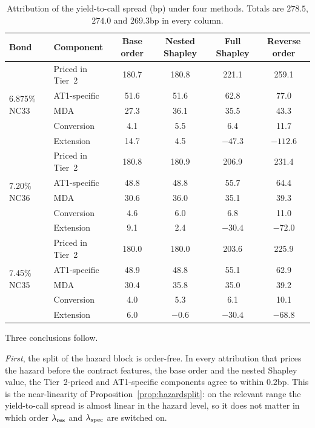 \begin{table}[H]
\centering\small
\begin{tabular}{llcccc}
\toprule
Bond & Component & Base order & Nested Shapley & Full Shapley & Reverse order \\
\midrule
\multirow{5}{*}{6.875\% NC33} & Priced in Tier~2 & 180.7 & 180.8 & 221.1 & 259.1 \\
 & AT1-specific & 51.6 & 51.6 & 62.8 & 77.0 \\
 & MDA & 27.3 & 36.1 & 35.5 & 43.3 \\
 & Conversion & 4.1 & 5.5 & 6.4 & 11.7 \\
 & Extension & 14.7 & 4.5 & $-47.3$ & $-112.6$ \\
\midrule
\multirow{5}{*}{7.20\% NC36} & Priced in Tier~2 & 180.8 & 180.9 & 206.9 & 231.4 \\
 & AT1-specific & 48.8 & 48.8 & 55.7 & 64.4 \\
 & MDA & 30.6 & 36.0 & 35.1 & 39.3 \\
 & Conversion & 4.6 & 6.0 & 6.8 & 11.0 \\
 & Extension & 9.1 & 2.4 & $-30.4$ & $-72.0$ \\
\midrule
\multirow{5}{*}{7.45\% NC35} & Priced in Tier~2 & 180.0 & 180.0 & 203.6 & 225.9 \\
 & AT1-specific & 48.9 & 48.8 & 55.1 & 62.9 \\
 & MDA & 30.4 & 35.8 & 35.0 & 39.2 \\
 & Conversion & 4.0 & 5.3 & 6.1 & 10.1 \\
 & Extension & 6.0 & $-0.6$ & $-30.4$ & $-68.8$ \\
\bottomrule
\end{tabular}
\caption{Attribution of the yield-to-call spread (bp) under four methods. Totals are
$278.5$, $274.0$ and $269.3$bp in every column.}
\label{tab:order}
\end{table}

Three conclusions follow.

\emph{First}, the split of the hazard block is order-free. In every attribution that prices
the hazard before the contract features, the base order and the nested Shapley value, the
Tier~2-priced and AT1-specific components agree to within $0.2$bp. This is the near-linearity
of Proposition~\ref{prop:hazardsplit}: on the relevant range the yield-to-call spread is
almost linear in the hazard level, so it does not matter in which order $\lambda_{\mathrm{res}}$ and $\lambda_{\mathrm{spec}}$
are switched on.

